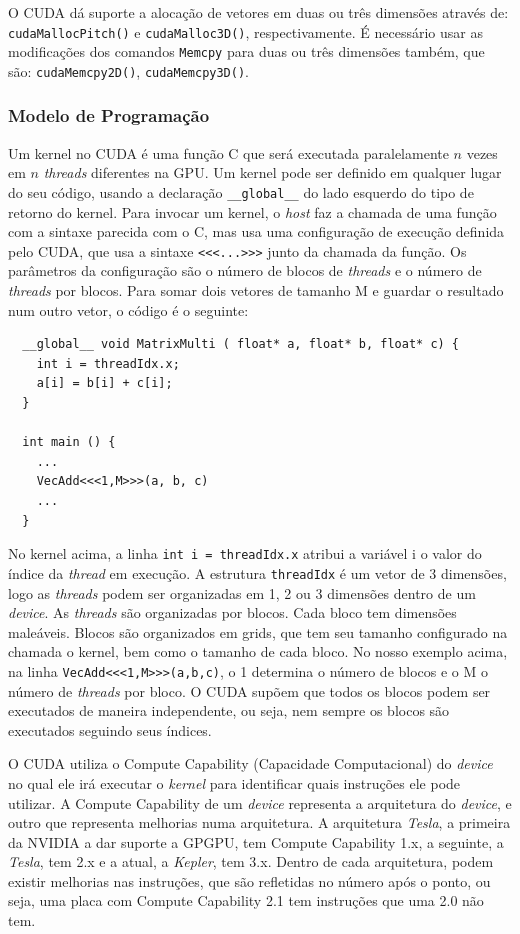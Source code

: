 O CUDA dá suporte a alocação de vetores em duas ou três dimensões através de: \verb#cudaMallocPitch()# e
\verb#cudaMalloc3D()#, respectivamente. É necessário usar as modificações dos comandos \verb#Memcpy# para
duas ou três dimensões também, que são: \verb#cudaMemcpy2D()#, \verb#cudaMemcpy3D()#.

\subsubsection{Modelo de Programação}
Um kernel no CUDA é uma função C que será executada paralelamente $n$ vezes em $n$ \textit{threads} diferentes na GPU. Um kernel pode ser
definido em qualquer lugar do seu código, usando a declaração \verb#__global__# do lado esquerdo do tipo de retorno do kernel.
Para invocar um kernel, o \textit{host} faz a chamada de uma função com a sintaxe parecida com o C, mas usa uma configuração de
execução definida pelo CUDA, que usa a sintaxe \verb#<<<...>>># junto da chamada da função. Os parâmetros da configuração são
o número de blocos de \textit{threads} e o número de \textit{threads} por blocos. Para somar dois vetores de tamanho M e guardar o resultado num
outro vetor, o código é o seguinte:

\begin{lstlisting}
  __global__ void MatrixMulti ( float* a, float* b, float* c) {
    int i = threadIdx.x;
    a[i] = b[i] + c[i];
  }

  int main () {
    ...
    VecAdd<<<1,M>>>(a, b, c)
    ...
  }
\end{lstlisting}

No kernel acima, a linha \verb#int i = threadIdx.x# atribui a variável i o valor do índice da \textit{thread} em execução.
A estrutura \verb#threadIdx# é um vetor de 3 dimensões, logo as \textit{threads} podem ser organizadas em 1, 2 ou 3 dimensões dentro de um
\textit{device}. As \textit{threads} são organizadas por blocos. Cada bloco tem dimensões maleáveis. Blocos são organizados em
grids, que tem seu tamanho configurado na chamada o kernel, bem como o tamanho de cada bloco. No nosso exemplo acima, na linha
\verb#VecAdd<<<1,M>>>(a,b,c)#, o 1 determina o número de blocos e o M o número de \textit{threads} por bloco.
O CUDA supõem que todos os blocos podem ser executados de maneira independente,
ou seja, nem sempre os blocos são executados seguindo seus índices.

O CUDA utiliza o Compute Capability (Capacidade Computacional) do \textit{device} no qual ele irá executar o \textit{kernel}
para identificar quais instruções ele pode utilizar. A Compute Capability de um \textit{device}
representa a arquitetura do \textit{device}, e outro que representa melhorias numa arquitetura.
A arquitetura \textit{Tesla}, a primeira da NVIDIA a dar suporte a GPGPU, tem Compute Capability 1.x, a seguinte, a \textit{Tesla},
tem 2.x e a atual, a \textit{Kepler}, tem 3.x. Dentro de cada arquitetura, podem existir melhorias nas instruções, que são
refletidas no número após o ponto, ou seja, uma placa com Compute Capability 2.1 tem instruções que uma 2.0 não tem.

